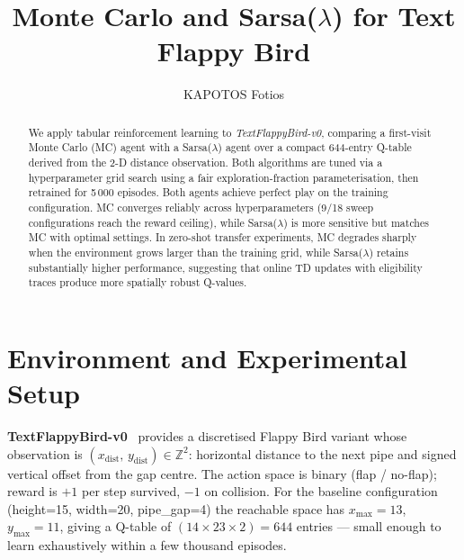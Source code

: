 \documentclass[runningheads]{llncs}
\begin{document}
\title{Monte Carlo and Sarsa($\lambda$) for Text Flappy Bird}

\author{KAPOTOS Fotios}

\maketitle

\begin{abstract}
We apply tabular reinforcement learning to \emph{TextFlappyBird-v0},
comparing a first-visit Monte Carlo (MC) agent with a Sarsa($\lambda$) agent
over a compact 644-entry Q-table derived from the 2-D distance observation.
Both algorithms are tuned via a hyperparameter grid search using a fair
exploration-fraction parameterisation, then retrained for 5\,000 episodes.
Both agents achieve perfect play on the training configuration.
MC converges reliably across hyperparameters (9/18 sweep configurations
reach the reward ceiling), while Sarsa($\lambda$) is more sensitive but
matches MC with optimal settings.
In zero-shot transfer experiments, MC degrades sharply when the environment
grows larger than the training grid, while Sarsa($\lambda$) retains
substantially higher performance, suggesting that online TD updates with
eligibility traces produce more spatially robust Q-values.
\end{abstract}

\section{Environment and Experimental Setup}

\textbf{TextFlappyBird-v0}~\cite{tfb_gym} provides a discretised Flappy Bird
variant whose observation is
$(x_\text{dist},\, y_\text{dist}) \in \mathbb{Z}^2$:
horizontal distance to the next pipe and signed vertical offset from the
gap centre.
The action space is binary (flap / no-flap); reward is $+1$ per step
survived, $-1$ on collision.
For the baseline configuration (height=15, width=20, pipe\_gap=4) the
reachable space has $x_\text{max}=13$, $y_\text{max}=11$, giving a Q-table
of $(14\times 23\times 2)=644$ entries — small enough to learn exhaustively
within a few thousand episodes.
\end{document}
